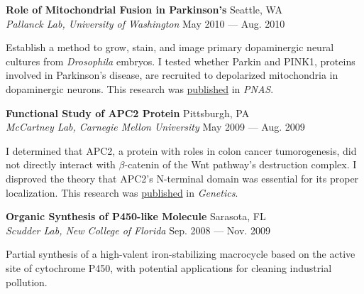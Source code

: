 \documentclass[a4paper,12pt]{article}
\newcommand{\ressubheading}[4]{{\begin{minipage}{\textwidth}
        \textbf{#1} \hfill #2 \\
        \textit{#3} \hfill #4 \\
        \end{minipage}}}
\begin{document}
    

    \ressubheading{Role of Mitochondrial Fusion in Parkinson's}{Seattle, WA}{Pallanck Lab, University of Washington}{May 2010 --- Aug. 2010}
    
\vspace{-6pt} Establish a method to grow, stain, and image primary dopaminergic neural cultures from \textit{Drosophila} embryos. I tested whether Parkin and PINK1, proteins involved in Parkinson's disease, are recruited to depolarized mitochondria in dopaminergic neurons. This research was \hyperlink{neuronpub}{published} in \textit{PNAS}.\\



    \ressubheading{Functional Study of APC2 Protein}{Pittsburgh, PA}{McCartney Lab, Carnegie Mellon University}{May 2009 --- Aug. 2009}
    
\vspace{-6pt} I determined that APC2, a protein  with roles in colon cancer tumorogenesis, did not directly interact with $\beta$-catenin of the Wnt pathway's destruction complex. I disproved the theory that APC2's N-terminal domain was essential for its proper localization. This research was \hyperlink{carnegiepub}{published} in \textit{Genetics}.\\

    \ressubheading{Organic Synthesis of P450-like Molecule}{Sarasota, FL}{Scudder Lab, New College of Florida}{Sep. 2008 --- Nov. 2009}
    
\vspace{-6pt} Partial synthesis of a high-valent iron-stabilizing macrocycle based on the active site of cytochrome P450, with potential applications for cleaning industrial pollution.\\
\end{document}
